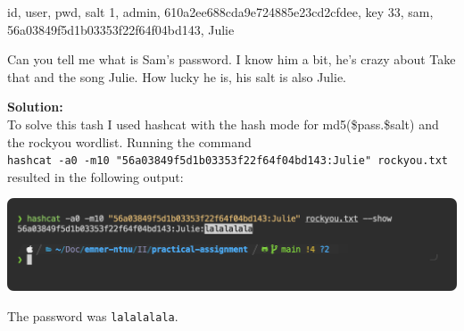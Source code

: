 id, user, pwd, salt 1, admin, 610a2ee688cda9e724885e23cd2cfdee, key 33, sam, 56a03849f5d1b03353f22f64f04bd143, Julie

Can you tell me what is Sam's password. I know him a bit, he's crazy about Take that and the song Julie. How lucky he is, his salt is also Julie.

\textbf{Solution:}\\
To solve this tash I used hashcat with the hash mode for md5(\$pass.\$salt) and the rockyou wordlist.
Running the command 
\\\texttt{hashcat -a0 -m10 "56a03849f5d1b03353f22f64f04bd143:Julie" rockyou.txt} resulted in the following output:

\begin{center}
    \includegraphics[width=15cm]{img/Hash cracking/Hash3/Screenshot 2023-11-24 at 23.05.42.png}
\end{center}

The password was \texttt{lalalalala}.
